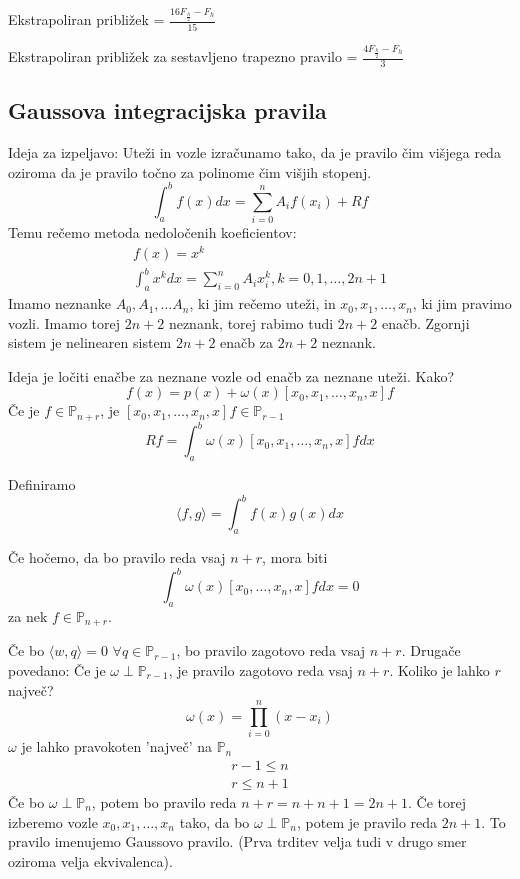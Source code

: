 \documentclass[a4paper,12pt]{article}
\newcommand{\innerproduct}[2]{\langle #1, #2 \rangle}
\theoremstyle{definition}
\theoremstyle{remark}
\newcommand{\Pp}{\mathbb{P}}
\begin{document}
Ekstrapoliran približek = $\frac{16 F_{\frac{h}{2}} - F_h}{15}$

Ekstrapoliran približek za sestavljeno trapezno pravilo = $\frac{4 F_{\frac{h}{2}} - F_h}{3}$

\subsection{Gaussova integracijska pravila}
Ideja za izpeljavo: Uteži in vozle izračunamo tako, da je pravilo čim višjega reda oziroma da je pravilo točno za polinome čim višjih stopenj.
\begin{equation*}
    \int_{a}^{b} f(x) dx = \sum_{i=0}^{n} A_i f(x_i) + Rf
\end{equation*}
Temu rečemo metoda nedoločenih koeficientov:
\begin{gather*}
    f(x) = x^k \\
    \int_{a}^{b} x^k dx = \sum_{i=0}^{n} A_i x_i^k ,k = 0, 1, \dots, 2n + 1
\end{gather*}
Imamo neznanke $A_0, A_1, \dots A_n$, ki jim rečemo uteži, in $x_0, x_1, \dots, x_n$, ki jim pravimo vozli. Imamo torej $2n + 2$ neznank, torej rabimo tudi $2n + 2$ enačb.
Zgornji sistem je nelinearen sistem $2n + 2$ enačb za $2n + 2$ neznank.

Ideja je ločiti enačbe za neznane vozle od enačb za neznane uteži. Kako?
\begin{equation*}
    f(x) = p(x) + \omega(x) [x_0, x_1, \dots, x_n, x] f
\end{equation*}
Če je $f \in \Pp_{n+r}$, je $[x_0, x_1, \dots, x_n, x] f \in \Pp_{r-1}$
\begin{equation*}
    Rf = \int_{a}^{b} \omega (x) [x_0, x_1, \dots, x_n, x] f dx
\end{equation*}

Definiramo 
\begin{equation*}
    \innerproduct{f}{g} = \int_{a}^{b} f(x) g(x) dx
\end{equation*}



Če hočemo, da bo pravilo reda vsaj $n+r$, mora biti
\begin{equation*}
    \int_{a}^{b} \omega (x) [x_0, \dots, x_n, x] f dx = 0
\end{equation*}
za nek $f \in \Pp_{n+r}$.

Če bo $\innerproduct{w}{q} = 0$ $\forall q \in \Pp_{r-1}$, bo pravilo zagotovo reda vsaj $n + r$. Drugače povedano: Če je $\omega \perp \Pp_{r-1}$,
je pravilo zagotovo reda vsaj $n + r$. Koliko je lahko $r$ največ?
\begin{equation*}
    \omega(x) = \prod_{i = 0}^{n} (x-x_i)
\end{equation*}
$\omega$ je lahko pravokoten 'največ' na $\Pp_n$
\begin{gather*}
    r - 1 \leq n \\
    r \leq n + 1
\end{gather*}
Če bo $\omega \perp \Pp_n$, potem bo pravilo reda $n+r = n + n + 1 = 2n + 1$. Če torej izberemo vozle $x_0, x_1, \dots, x_n$ tako, da bo $\omega \perp \Pp_n$,
potem je pravilo reda $2n + 1$. To pravilo imenujemo Gaussovo pravilo. (Prva trditev velja tudi v drugo smer oziroma velja ekvivalenca).
\end{document}
